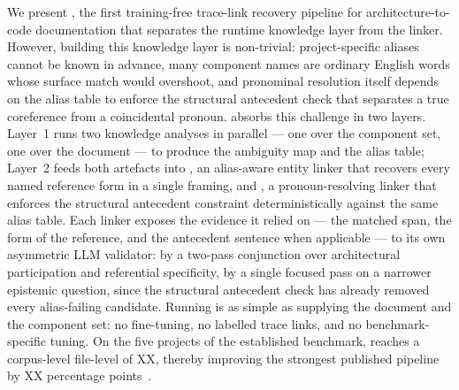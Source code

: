 We present \approach, the first training-free trace-link recovery pipeline for architecture-to-code documentation that separates the runtime knowledge layer from the linker.
However, building this knowledge layer is non-trivial: project-specific aliases cannot be known in advance, many component names are ordinary English words whose surface match would overshoot, and pronominal resolution itself depends on the alias table to enforce the structural antecedent check that separates a true coreference from a coincidental pronoun.
\approach absorbs this challenge in two layers.
Layer~1 runs two knowledge analyses in parallel --- one over the component set, one over the document --- to produce the ambiguity map and the alias table; Layer~2 feeds both artefacts into \linkerB, an alias-aware entity linker that recovers every named reference form in a single framing, and \linkerC, a pronoun-resolving linker that enforces the structural antecedent constraint deterministically against the same alias table.
Each linker exposes the evidence it relied on --- the matched span, the form of the reference, and the antecedent sentence when applicable --- to its own asymmetric \ac{LLM} validator: \linkerB by a two-pass conjunction over architectural participation and referential specificity, \linkerC by a single focused pass on a narrower epistemic question, since the structural antecedent check has already removed every alias-failing candidate.
Running \approach is as simple as supplying the document and the component set: no fine-tuning, no labelled trace links, and no benchmark-specific tuning.
On the five projects of the established benchmark, \approach reaches a corpus-level file-level \fone of XX, thereby improving the strongest published pipeline by XX percentage points~\cite{keim_recovering_2024,replication}.


